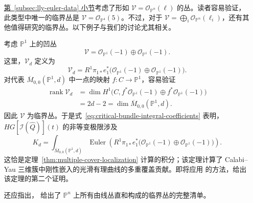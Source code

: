 \hyperref[subsec:lly-euler-data]{第~\ref*{subsec:lly-euler-data} 小节}考虑了形如 $\mathcal V=\mathcal O_{\mathbb P^n}(\ell)$ 的丛。读者容易验证，此类型中唯一的临界丛是 $\mathcal V=\mathcal O_{\mathbb P^4}(5)$。不过，对于 $\mathcal V=\bigoplus_i\mathcal O_{\mathbb P^n}(\ell_i)$，还有其他值得研究的临界丛。以下例子与我们的讨论尤其相关。
\begin{example}\label{ex:critical-multiple-cover-bundle}
考虑 $\mathbb P^1$ 上的凹丛
\[
\mathcal V=\mathcal O_{\mathbb P^1}(-1)\oplus\mathcal O_{\mathbb P^1}(-1).
\]
这里，$\mathcal V_d$ 定义为
\[
\mathcal V_d=R^1\pi_{1*}e_1^*\bigl(\mathcal O_{\mathbb P^1}(-1)\oplus\mathcal O_{\mathbb P^1}(-1)\bigr).
\]
对代表 $\overline M_{0,0}(\mathbb P^1,d)$ 中一点的映射 $f:C\to\mathbb P^1$，容易验证
\[
\begin{aligned}
\operatorname{rank}\mathcal V_d
&=\dim H^1\bigl(C,f^*\mathcal O_{\mathbb P^1}(-1)\oplus f^*\mathcal O_{\mathbb P^1}(-1)\bigr)\\
&=2d-2=\dim\overline M_{0,0}(\mathbb P^1,d).
\end{aligned}
\]
因此 $\mathcal V$ 为临界丛。于是式~\eqref{eq:critical-bundle-integral-coefficients} 表明，$HG[\mathcal I(\widehat Q)](t)$ 的非等变极限涉及
\[
K_d=\int_{\overline M_{0,0}(\mathbb P^1,d)}
\operatorname{Euler}\!\left(R^1\pi_{1*}e_1^*
\bigl(\mathcal O_{\mathbb P^1}(-1)\oplus\mathcal O_{\mathbb P^1}(-1)\bigr)\right).
\]
这恰是定理~\ref{thm:multiple-cover-localization} 计算的积分；该定理计算了 Calabi--Yau 三维簇中刚性嵌入的光滑有理曲线的多重覆盖贡献。即将应用  的方法，给出该定理的第二个证明。
\end{example}
还应指出， 给出了 $\mathbb P^n$ 上所有由线丛直和构成的临界丛的完整清单。
